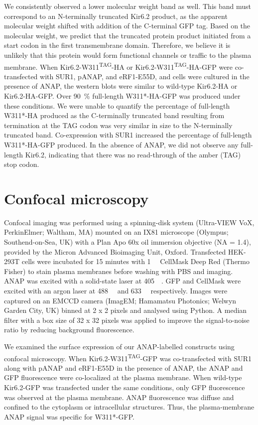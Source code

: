 We consistently observed a lower molecular weight band as well.
This band must correspond to an N-terminally truncated Kir6.2 product, as the apparent molecular weight shifted with addition of the C-terminal GFP tag.
Based on the molecular weight, we predict that the truncated protein product initiated from a start codon in the first transmembrane domain.
Therefore, we believe it is unlikely that this protein would form functional channels or traffic to the plasma membrane.
When Kir6.2-W311\textsuperscript{TAG}-HA or Kir6.2-W311\textsuperscript{TAG}-HA-GFP were co-transfected with SUR1, pANAP, and eRF1-E55D, and cells were cultured in the presence of ANAP, the western blots were similar to wild-type Kir6.2-HA or Kir6.2-HA-GFP.
Over \SI{90}{\percent} full-length W311*-HA-GFP was produced under these conditions.
We were unable to quantify the percentage of full-length W311*-HA produced as the C-terminally truncated band resulting from termination at the TAG codon was very similar in size to the N-terminally truncated band.
Co-expression with SUR1 increased the percentage of full-length W311*-HA-GFP produced.
In the absence of ANAP, we did not observe any full-length Kir6.2, indicating that there was no read-through of the amber (TAG) stop codon.

\section{Confocal microscopy}
Confocal imaging was performed using a spinning-disk system (Ultra-VIEW VoX, PerkinElmer; Waltham, MA) mounted on an IX81 microscope (Olympus; Southend-on-Sea, UK) with a Plan Apo 60x oil immersion objective (NA = 1.4), provided by the Micron Advanced Bioimaging Unit, Oxford.
Transfected HEK-293T cells were incubated for 15 minutes with \SI{1}{\nano\Molar} CellMask Deep Red (Thermo Fisher) to stain plasma membranes before washing with PBS and imaging.
ANAP was excited with a solid-state laser at \SI{405}{\nano\Molar}.
GFP and CellMask were excited with an argon laser at \SI{488}{\nano\Molar} and \SI{633}{\nano\Molar} respectively.
Images were captured on an EMCCD camera (ImagEM; Hamamatsu Photonics; Welwyn Garden City, UK) binned at 2 x 2 pixels and analysed using Python.
A median filter with a box size of 32 x 32 pixels was applied to improve the signal-to-noise ratio by reducing background fluorescence.

We examined the surface expression of our ANAP-labelled constructs using confocal microscopy.
When Kir6.2-W311\textsuperscript{TAG}-GFP was co-transfected with SUR1 along with pANAP and eRF1-E55D in the presence of ANAP, the ANAP and GFP fluorescence were co-localized at the plasma membrane.
When wild-type Kir6.2-GFP was transfected under the same conditions, only GFP fluorescence was observed at the plasma membrane.
ANAP fluorescence was diffuse and confined to the cytoplasm or intracellular structures.
Thus, the plasma-membrane ANAP signal was specific for W311*-GFP.


